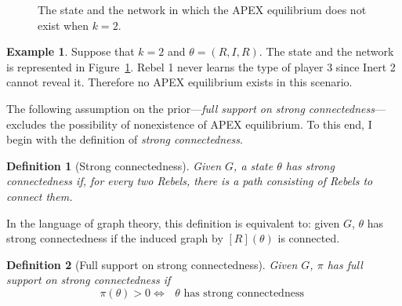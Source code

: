 \documentclass[12pt,letter]{article}
\newtheorem{definition}{Definition}[section]
\theoremstyle{definition}
\newtheorem{example}{Example}
\theoremstyle{remark}
\theoremstyle{claim}
\begin{document}
\begin{figure}



\begin{center}
\end{center}

\caption{The state and the network in which the APEX equilibrium does not exist when $k=2$.}
\label{fig:strong_connectedness}
\end{figure}

\begin{example}\label{ex_strong_connectedness}
Suppose that $k=2$ and $\theta=(R,I,R)$. The state and the network is represented in Figure~\ref{fig:strong_connectedness}. Rebel 1 never learns the type of player 3 since Inert 2 cannot reveal it. Therefore no APEX equilibrium exists in this scenario.
\end{example}

The following assumption on the prior---\textit{full support on strong connectedness}---excludes the possibility of nonexistence of APEX equilibrium. To this end, I begin with the definition of \textit{strong connectedness}.

\begin{definition}[Strong connectedness]
Given $G$, a state $\theta$ has strong connectedness if, for every two Rebels, there is a path consisting of Rebels to connect them.

\end{definition}  

In the language of graph theory, this definition is equivalent to: given $G$, $\theta$ has strong connectedness if the induced graph by $[R](\theta)$ is connected.

\begin{definition}[Full support on strong connectedness]
Given $G$, $\pi$ has full support on strong connectedness if 
\[\pi(\theta)>0\Leftrightarrow \text{ $\theta$ has strong connectedness }\] 
\end{definition}  
\end{document}
